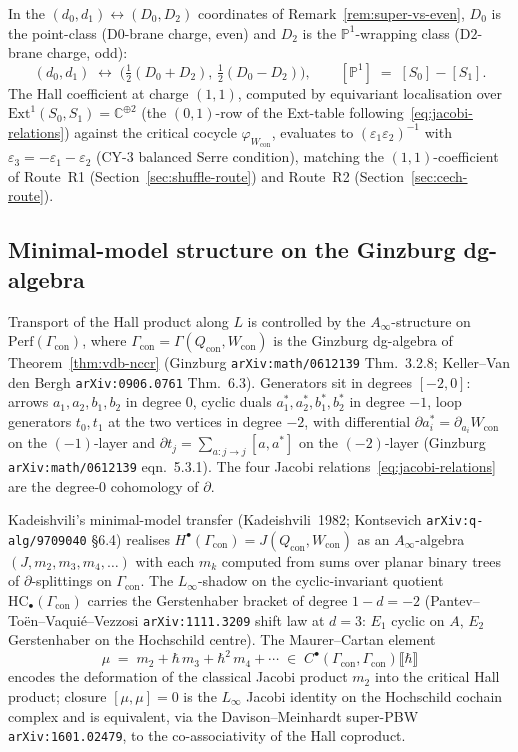 \documentclass[11pt]{amsart}
\theoremstyle{definition}
\providecommand{\Ext}{\mathrm{Ext}}
\providecommand{\bC}{\mathbb{C}}
\providecommand{\bP}{\mathbb{P}}
\begin{document}
In the $(d_0, d_1) \leftrightarrow (D_0, D_2)$ coordinates of
Remark~\ref{rem:super-vs-even}, $D_0$ is the point-class (D$0$-brane
charge, even) and $D_2$ is the $\bP^1$-wrapping class (D$2$-brane
charge, odd):
\[
  (d_0, d_1) \;\longleftrightarrow\;
  \bigl(\tfrac{1}{2}(D_0 + D_2),\,\tfrac{1}{2}(D_0 - D_2)\bigr),
  \qquad
  [\bP^1] \;=\; [S_0] - [S_1].
\]
The Hall coefficient at charge $(1,1)$, computed by equivariant
localisation over $\Ext^1(S_0, S_1) = \bC^{\oplus 2}$ (the $(0,1)$-row
of the Ext-table following~\eqref{eq:jacobi-relations}) against the
critical cocycle $\varphi_{W_{\mathrm{con}}}$, evaluates to
$(\varepsilon_1 \varepsilon_2)^{-1}$ with $\varepsilon_3 =
-\varepsilon_1 - \varepsilon_2$ (CY-$3$ balanced Serre condition),
matching the $(1,1)$-coefficient of Route~R1
(Section~\ref{sec:shuffle-route}) and Route~R2
(Section~\ref{sec:cech-route}).

\subsection{Minimal-model structure on the Ginzburg dg-algebra}
\label{subsec:vdb-ainfty}

Transport of the Hall product along $L$ is controlled by the
$A_\infty$-structure on $\mathrm{Perf}(\Gamma_{\mathrm{con}})$, where
$\Gamma_{\mathrm{con}} = \Gamma(Q_{\mathrm{con}}, W_{\mathrm{con}})$
is the Ginzburg dg-algebra of Theorem~\ref{thm:vdb-nccr} (Ginzburg
\texttt{arXiv:math/0612139} Thm.~3.2.8; Keller--Van den Bergh
\texttt{arXiv:0906.0761} Thm.~6.3). Generators sit in degrees
$[-2, 0]$: arrows $a_1, a_2, b_1, b_2$ in degree $0$, cyclic duals
$a_1^*, a_2^*, b_1^*, b_2^*$ in degree $-1$, loop generators $t_0,
t_1$ at the two vertices in degree $-2$, with differential
$\partial a_i^* = \partial_{a_i} W_{\mathrm{con}}$ on the
$(-1)$-layer and $\partial t_j = \sum_{a: j \to j}[a, a^*]$ on the
$(-2)$-layer (Ginzburg \texttt{arXiv:math/0612139} eqn.~5.3.1). The
four Jacobi relations~\eqref{eq:jacobi-relations} are the
degree-$0$ cohomology of $\partial$.

Kadeishvili's minimal-model transfer (Kadeishvili~1982; Kontsevich
\texttt{arXiv:q-alg/9709040} \S6.4) realises
$H^\bullet(\Gamma_{\mathrm{con}}) = J(Q_{\mathrm{con}}, W_{\mathrm{con}})$
as an $A_\infty$-algebra $(J, m_2, m_3, m_4, \dots)$ with each $m_k$
computed from sums over planar binary trees of $\partial$-splittings on
$\Gamma_{\mathrm{con}}$. The $L_\infty$-shadow on the cyclic-invariant
quotient $\mathrm{HC}_\bullet(\Gamma_{\mathrm{con}})$ carries the
Gerstenhaber bracket of degree $1 - d = -2$
(Pantev--To\"en--Vaqui\'e--Vezzosi \texttt{arXiv:1111.3209} shift law at
$d = 3$: $E_1$ cyclic on $A$, $E_2$ Gerstenhaber on the Hochschild
centre). The Maurer--Cartan element
\[
  \mu \;=\; m_2 + \hbar\, m_3 + \hbar^2\, m_4 + \cdots
  \;\in\; C^\bullet(\Gamma_{\mathrm{con}}, \Gamma_{\mathrm{con}})
  \llbracket \hbar \rrbracket
\]
encodes the deformation of the classical Jacobi product $m_2$ into the
critical Hall product; closure $[\mu, \mu] = 0$ is the $L_\infty$
Jacobi identity on the Hochschild cochain complex and is equivalent,
via the Davison--Meinhardt super-PBW \texttt{arXiv:1601.02479}, to the
co-associativity of the Hall coproduct.
\end{document}
